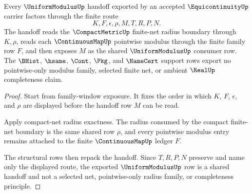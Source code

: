 \begin{theorem}
\label{thm:equicontinuity-uniform-modulus-handoff}
Every $\UniformModulusUp$ handoff exported by an accepted $\EquicontinuityUp$ carrier factors through the finite route
$$
K,F,\epsilon,\rho,M,T,R,P,N .
$$
The handoff reads the $\CompactMetricUp$ finite-net radius boundary through $K,\rho$, reads each $\ContinuousMapUp$ pointwise modulus through the finite family row $F$, and then exposes $M$ as the shared $\UniformModulusUp$ consumer row. The $\BHist$, $\hsame$, $\Cont$, $\Pkg$, and $\NameCert$ support rows export no pointwise-only modulus family, selected finite net, or ambient $\RealUp$ completeness claim.
\end{theorem}
\begin{proof}
Start from family-window exposure. It fixes the order in which $K$, $F$, $\epsilon$, and $\rho$ are displayed before the handoff row $M$ can be read.

Apply compact-net radius exactness. The radius consumed by the compact finite-net boundary is the same shared row $\rho$, and every pointwise modulus entry remains attached to the finite $\ContinuousMapUp$ ledger $F$.

The structural rows then repack the handoff. Since $T,R,P,N$ preserve and name only the displayed route, the exported $\UniformModulusUp$ row is a shared handoff and not a selected net, pointwise-only radius family, or completeness principle.
\end{proof}




